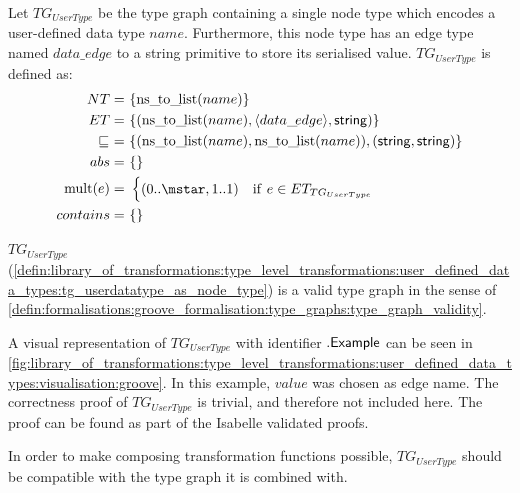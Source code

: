 \begin{defin}
\label{defin:library_of_transformations:type_level_transformations:user_defined_data_types:tg_userdatatype_as_node_type}
Let $TG_{UserType}$ be the type graph containing a single node type which encodes a user-defined data type $name$. Furthermore, this node type has an edge type named $data\_\!edge$ to a string primitive to store its serialised value. $TG_{UserType}$ is defined as:
\begin{align*}
NT =\ &\{\mathrm{ns\_\!to\_\!list}(name)\} \\
ET =\ &\{(\mathrm{ns\_\!to\_\!list}(name), \langle data\_\!edge \rangle, \type{string})\} \\
\!\!\sqsubseteq\ =\ &\{( \mathrm{ns\_\!to\_\!list}(name), \mathrm{ns\_\!to\_\!list}(name) ), ( \type{string}, \type{string} )\} \\
abs =\ &\{\} \\
\mathrm{mult}(e) =\ &\begin{cases}
    (0..\mstar, 1..1) &\mathrm{if}\ e \in ET_{TG_{UserType}}
\end{cases}\\
contains =\ &\{\}
\end{align*}
\end{defin}

\begin{thm}
\label{defin:library_of_transformations:type_level_transformations:user_defined_data_types:tg_userdatatype_as_node_type_correct}
$TG_{UserType}$ (\cref{defin:library_of_transformations:type_level_transformations:user_defined_data_types:tg_userdatatype_as_node_type}) is a valid type graph in the sense of \cref{defin:formalisations:groove_formalisation:type_graphs:type_graph_validity}.
\end{thm}

A visual representation of $TG_{UserType}$ with identifier $.\mathsf{Example}$ can be seen in \cref{fig:library_of_transformations:type_level_transformations:user_defined_data_types:visualisation:groove}. In this example, $value$ was chosen as edge name. The correctness proof of $TG_{UserType}$ is trivial, and therefore not included here. The proof can be found as part of the Isabelle validated proofs.

In order to make composing transformation functions possible, $TG_{UserType}$ should be compatible with the type graph it is combined with.

